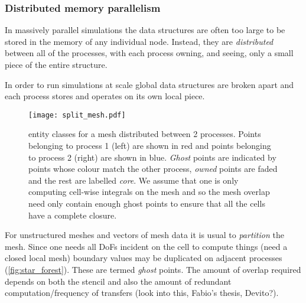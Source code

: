 \documentclass[thesis]{subfiles}
\begin{document}
\subsubsection{Distributed memory parallelism}
\label{sec:intro_mpi}


In massively parallel simulations the data structures are often too large to be stored in the memory of any individual node.
Instead, they are \textit{distributed} between all of the processes, with each process owning, and seeing, only a small piece of the entire structure.

In order to run simulations at scale global data structures are broken apart and each process stores and operates on its own local piece.

\begin{figure}
  \centering
  \texttt{[image: split\_mesh.pdf]}
  \caption{
     entity classes for a mesh distributed between 2 processes.
    Points belonging to process 1 (left) are shown in red and points belonging to process 2 (right) are shown in blue.
    \textit{Ghost} points are indicated by points whose colour match the other process, \textit{owned} points are faded and the rest are labelled \textit{core}.
    We assume that one is only computing cell-wise integrals on the mesh and so the mesh overlap need only contain enough ghost points to ensure that all the cells have a complete closure.
  }
  \label{fig:pyop2_split_mesh}
\end{figure}


For unstructured meshes and vectors of mesh data it is usual to \textit{partition} the mesh.
Since one needs all DoFs incident on the cell to compute things (need a closed local mesh) boundary values may be duplicated on adjacent processes (\cref{fig:star_forest}).
These are termed \textit{ghost} points.
The amount of overlap required depends on both the stencil and also the amount of redundant computation/frequency of transfers (look into this, Fabio's thesis, Devito?).
\end{document}
